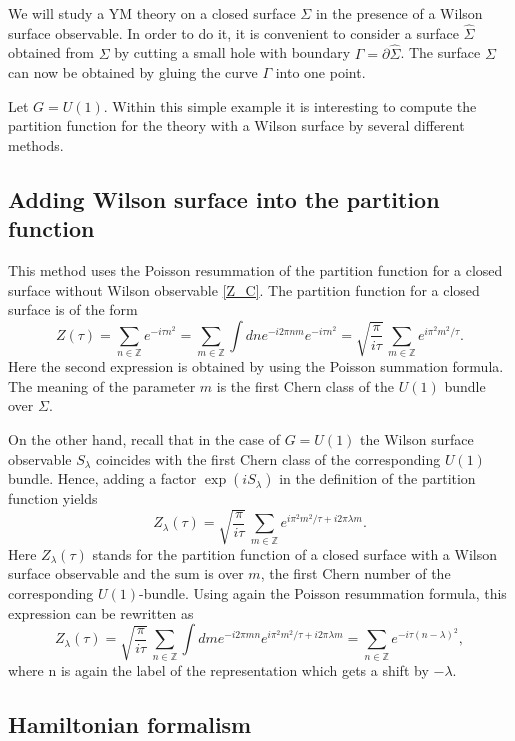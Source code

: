 \documentclass[11pt]{report}
\theoremstyle{plain}
\theoremstyle{definition}
\theoremstyle{remark}
\theoremstyle{remark}
\numberwithin{equation}{section}
\begin{document}
We will study a YM theory on a closed surface $\Sigma$ in the presence of a Wilson surface observable. In order to do it, it is
convenient to consider a surface $\widehat{\Sigma}$ obtained from $\Sigma$ by cutting a small hole with boundary
 $\Gamma = \partial \widehat{\Sigma}$. The surface $\Sigma$ can now be obtained by gluing the curve $\Gamma$ into one point.
 
Let $G=U(1)$. Within this simple example it is interesting to compute the partition function for the theory with a Wilson surface by several different methods.

\subsection{Adding Wilson surface into the partition function}
This method uses the Poisson resummation of the partition function for a closed surface without Wilson observable \eqref{Z_C}. The partition function for a closed surface is of the form
%
$$
Z(\tau) =  \sum_{n \in \mathbb{Z}} e^{ -i\tau n^2} = \sum_{m \in \mathbb{Z}}  \int dn e^{-i2\pi nm}e^{-i\tau n^2} =
\sqrt{\frac{\pi}{i\tau}} \, \sum_{m \in \mathbb{Z}} e^{ i\pi^2m^2/\tau}.
$$
Here the second expression is obtained by using the Poisson summation formula. The meaning of the 
parameter $m$ is the first Chern class of the $U(1)$ bundle over $\Sigma$.


On the other hand, recall that in the case of $G=U(1)$ the Wilson surface observable $S_\lambda$ coincides with the first Chern class of the 
corresponding $U(1)$ bundle. Hence, adding a factor $\exp(i S_\lambda)$ in the definition of the partition function
yields
%
$$
Z_\lambda(\tau) = \sqrt{\frac{\pi}{i\tau}} \, \sum_{m \in \mathbb{Z}} e^{ i\pi^2m^2/\tau + i 2\pi \lambda m}.
$$
Here $Z_\lambda(\tau)$ stands for the partition function of a closed surface with a Wilson surface observable and the sum is over $m$, the first Chern number of the corresponding $U(1)$-bundle. Using again the Poisson resummation formula, this expression can be rewritten as
%
$$
Z_\lambda(\tau) =  \sqrt{\frac{\pi}{i\tau}} \, \sum_{n \in \mathbb{Z}} \int dm e^{-i2\pi mn} e^{ i\pi^2m^2/\tau + i 2\pi \lambda m} = \sum_{n \in \mathbb{Z}} e^{-i\tau (n-\lambda)^2},
$$
 where n is again the label of the representation which gets a shift by $-\lambda$.
 
 \subsection{Hamiltonian formalism}
\end{document}
